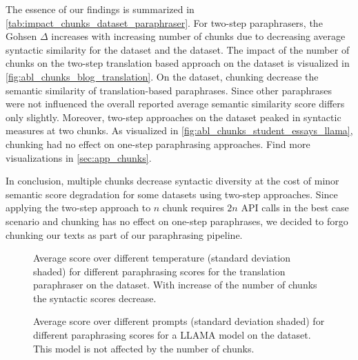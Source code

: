 The essence of our findings is summarized in \autoref{tab:impact_chunks_dataset_paraphraser}.
For two-step paraphrasers, the Gohsen $\Delta$ increases with increasing number of chunks due to decreasing average syntactic similarity for the \dataBlog{} dataset and the \dataStudent{} dataset.
The impact of the number of chunks on the two-step translation based approach on the \dataBlog{} dataset is visualized in \autoref{fig:abl_chunks_blog_translation}.
On the \dataGutenberg{} dataset, chunking decrease the semantic similarity of translation-based paraphrases. 
Since other paraphrases were not influenced the overall reported average semantic similarity score differs only slightly.
Moreover, two-step approaches on the \dataPan{} dataset peaked in syntactic measures at two chunks.
As visualized in \autoref{fig:abl_chunks_student_essays_llama}, chunking had no effect on one-step paraphrasing approaches.
Find more visualizations in \autoref{sec:app_chunks}.

In conclusion, multiple chunks decrease syntactic diversity at the cost of minor semantic score degradation for some datasets using two-step approaches.
Since applying the two-step approach to $n$ chunk requires $2n$ API calls in the best case scenario and chunking has no effect on one-step paraphrases, we decided to forgo chunking our texts as part of our paraphrasing pipeline.

 
\begin{figure}[htbp]
    \centering
    
    \caption{Average score over different temperature (standard deviation shaded) for different paraphrasing scores for the translation paraphraser on the \dataBlog{} dataset.
    With increase of the number of chunks the syntactic scores decrease.}
    \label{fig:abl_chunks_blog_translation}
\end{figure}



\begin{figure}[htbp]
    \centering
    
    \caption{Average score over different prompts (standard deviation shaded) for different paraphrasing scores for a LLAMA model on the \dataStudent{} dataset. 
    This model is not affected by the number of chunks.}
    \label{fig:abl_chunks_student_essays_llama}
\end{figure}